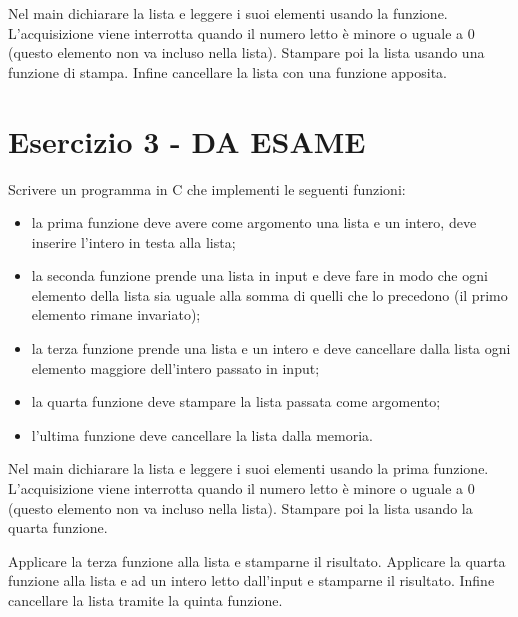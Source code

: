 \documentclass[italian,oneside,headinclude,10pt]{scrartcl}
\begin{document}
Nel main dichiarare la lista e leggere i suoi elementi usando la funzione. L'acquisizione viene interrotta quando il numero letto è minore o uguale a $0$ (questo elemento non va incluso nella lista). Stampare poi la lista usando una funzione di stampa. Infine cancellare la lista con una funzione apposita.

\section{Esercizio 3 - DA ESAME}

Scrivere un programma in C che implementi le seguenti funzioni:
\begin{itemize}
    \item la prima funzione deve avere come argomento una lista e un intero, deve inserire l'intero in testa alla lista;
    \item la seconda funzione prende una lista in input e deve fare in modo che ogni elemento della lista sia uguale alla somma di quelli che lo precedono (il primo elemento rimane invariato);
    \item la terza funzione prende una lista e un intero e deve cancellare dalla lista ogni elemento maggiore dell'intero passato in input;
    \item la quarta funzione deve stampare la lista passata come argomento;
    \item l'ultima funzione deve cancellare la lista dalla memoria.
\end{itemize}

Nel main dichiarare la lista e leggere i suoi elementi usando la prima funzione. L'acquisizione viene interrotta quando il numero letto è minore o uguale a $0$ (questo elemento non va incluso nella lista). Stampare poi la lista usando la quarta funzione.

Applicare la terza funzione alla lista e stamparne il risultato. Applicare la quarta funzione alla lista e ad un intero letto dall'input e stamparne il risultato. Infine cancellare la lista tramite la quinta funzione.
\end{document}
